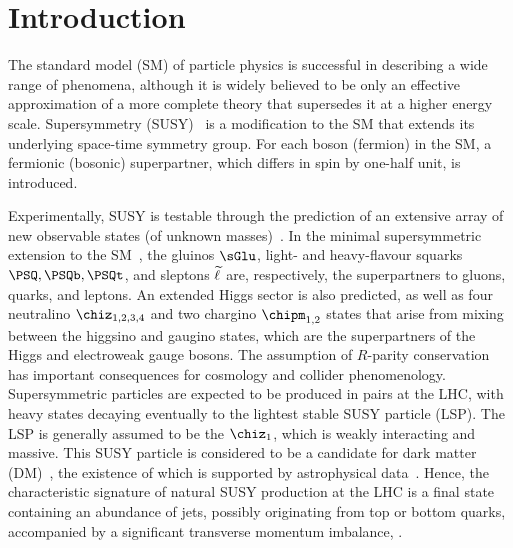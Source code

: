 \section{Introduction}
\label{sec:introduction}

The standard model (SM) of particle physics is successful in
describing a wide range of phenomena, although it is widely believed
to be only an effective approximation of a more complete theory that
supersedes it at a higher energy scale. Supersymmetry
(SUSY)~\cite{ref:SUSY-1, ref:SUSY0, ref:SUSY3, ref:SUSY1} is a
modification to the SM that extends its underlying space-time symmetry
group. For each boson (fermion) in the SM, a fermionic (bosonic)
superpartner, which differs in spin by one-half unit, is introduced.

Experimentally, SUSY is testable through the prediction of an
extensive array of new observable states (of unknown
masses)~\cite{ref:SUSY4, ref:SUSY2}. In the minimal supersymmetric
extension to the SM~\cite{ref:SUSY2}, the gluinos $\sGlu$, light- and
heavy-flavour squarks $\PSQ, \PSQb, \PSQt$, and sleptons $\widetilde{\ell}$ are,
respectively, the superpartners to gluons, quarks, and leptons. An
extended Higgs sector is also predicted, as well as four neutralino
$\chiz_{1,2,3,4}$ and two chargino $\chipm_{1,2}$ states that arise
from mixing between the higgsino and gaugino states, which are the
superpartners of the Higgs and electroweak gauge bosons.  The
assumption of $R$-parity conservation~\cite{Farrar:1978xj} has
important consequences for cosmology and collider
phenomenology. Supersymmetric particles are expected to be produced in
pairs at the LHC, with heavy states decaying eventually to the
lightest stable SUSY particle (LSP). The LSP is generally assumed to
be the $\chiz_1$, which is weakly interacting and massive. This SUSY
particle is considered to be a candidate for dark matter
(DM)~\cite{Jungman:1995df}, the existence of which is supported by
astrophysical data~\cite{1674-1137-38-9-090001}.  Hence, the
characteristic signature of natural SUSY production at the LHC is a
final state containing an abundance of jets, possibly originating from
top or bottom quarks, accompanied by a significant transverse momentum
imbalance, \ptvecmiss.

